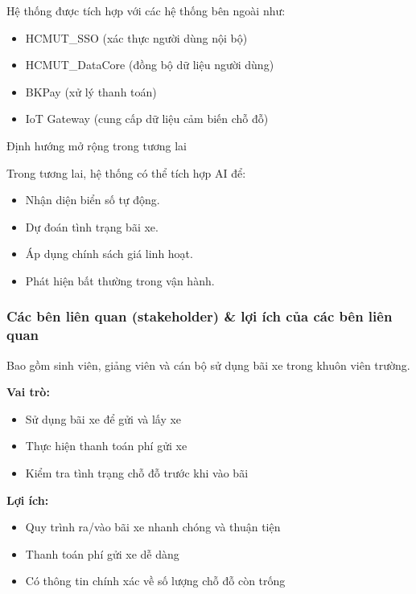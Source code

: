 Hệ thống được tích hợp với các hệ thống bên ngoài như:

\begin{itemize}
    \item HCMUT\_SSO (xác thực người dùng nội bộ)
    \item HCMUT\_DataCore (đồng bộ dữ liệu người dùng)
    \item BKPay (xử lý thanh toán)
    \item IoT Gateway (cung cấp dữ liệu cảm biến chỗ đỗ)
\end{itemize}
Định hướng mở rộng trong tương lai

Trong tương lai, hệ thống có thể tích hợp AI để:
\begin{itemize}
    \item Nhận diện biển số tự động.
    \item Dự đoán tình trạng bãi xe.
    \item Áp dụng chính sách giá linh hoạt.
    \item Phát hiện bất thường trong vận hành.
\end{itemize}

\subsubsection{Các bên liên quan (stakeholder) \& lợi ích của các bên liên quan}



Bao gồm sinh viên, giảng viên và cán bộ sử dụng bãi xe trong khuôn viên trường.

\textbf{Vai trò:}
\begin{itemize}
    \item Sử dụng bãi xe để gửi và lấy xe
    \item Thực hiện thanh toán phí gửi xe
    \item Kiểm tra tình trạng chỗ đỗ trước khi vào bãi
\end{itemize}

\textbf{Lợi ích:}
\begin{itemize}
    \item Quy trình ra/vào bãi xe nhanh chóng và thuận tiện
    \item Thanh toán phí gửi xe dễ dàng
    \item Có thông tin chính xác về số lượng chỗ đỗ còn trống
\end{itemize}


